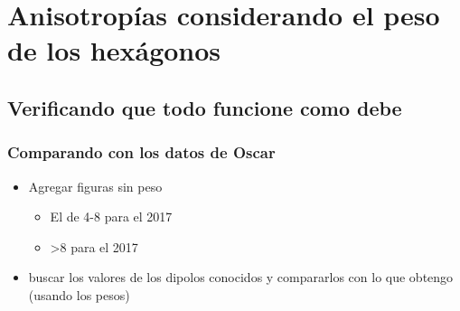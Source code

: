 %



\section{Anisotropías  considerando el peso de los hexágonos}

\subsection{Verificando que todo funcione como debe}





\subsubsection{Comparando con los datos de Oscar}

\begin{itemize}
	\item Agregar figuras sin peso 
	\begin{itemize}
		\item El de 4-8 para el 2017
		\item >8 para el 2017
	\end{itemize}
	\item buscar los valores de los dipolos conocidos y compararlos con lo que obtengo (usando los pesos)
\end{itemize}

